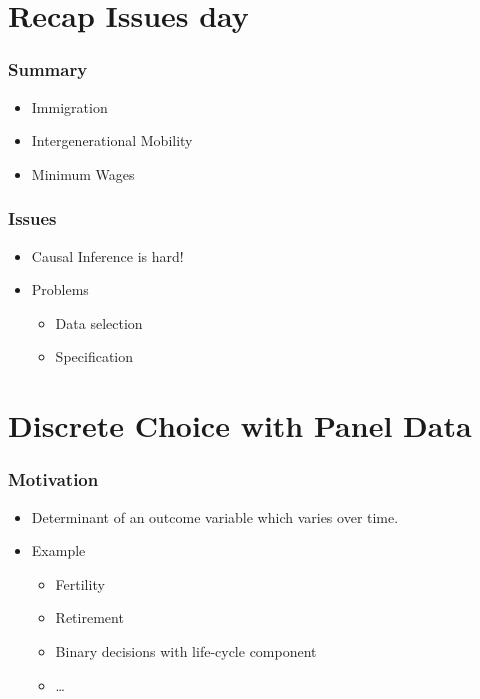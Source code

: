 \documentclass{beamer}
\newcommand{\1}{\mathbb{1}}
\begin{document}
\section{Recap Issues day}

\begin{frame}
\tableofcontents[currentsection] 
\end{frame}

\begin{frame}\frametitle{Summary}
\begin{itemize}
\item Immigration
\item Intergenerational Mobility
\item Minimum Wages
\end{itemize}
\end{frame}

\begin{frame}\frametitle{Issues}
\begin{itemize}
\item Causal Inference is hard!
\item Problems
\begin{itemize}
\item Data selection
\item Specification
\end{itemize}
\end{itemize}
\end{frame}


\section{Discrete Choice with Panel Data}

\begin{frame}
\tableofcontents[currentsection] 
\end{frame}

\begin{frame}\frametitle{Motivation}
\begin{itemize}
\item Determinant of an outcome variable which varies over time.
\item Example
\begin{itemize}
\item Fertility 
\item Retirement
\item Binary decisions with life-cycle component
\item \ldots
\end{itemize}
\end{itemize}
\end{frame}
\end{document}
